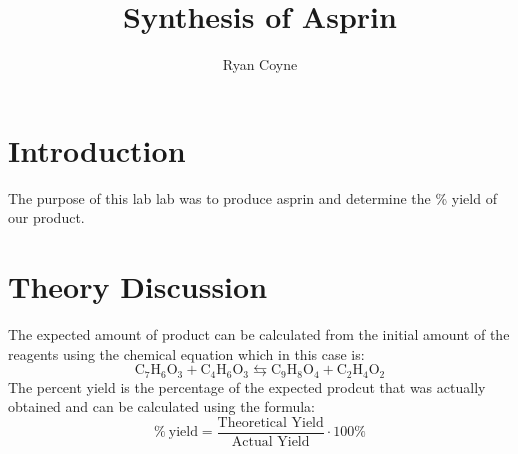 \documentclass[12pt]{article}
\begin{document}
    \title{Synthesis of Asprin}
    \author{Ryan Coyne}
    \maketitle
    \section*{Introduction}
        The purpose of this lab lab was to produce asprin and determine the \% yield of our product.
    \section*{Theory Discussion}
        The expected amount of product can be calculated from the initial amount of the reagents using the chemical equation which in this case is:
        \begin{equation*}
            \mathrm{C_7H_6O_3} + \mathrm{C_4H_6O_3} \leftrightarrows \mathrm{C_9H_8O_4} + \mathrm{C_2 H_4O_2}
        \end{equation*}
        The percent yield is the percentage of the expected prodcut that was actually obtained and can be calculated using the formula:
        \begin{equation*}
            \%~\text{yield} = \frac{\text{Theoretical Yield}}{\text{Actual Yield}} \cdot 100\%
        \end{equation*}
\end{document}
